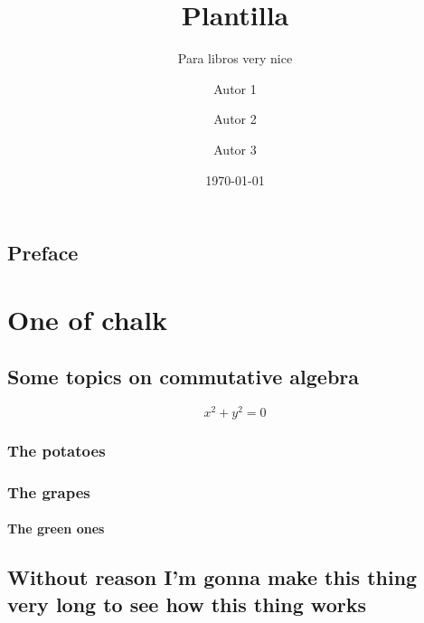 \documentclass[draft]{qx-files/qx-book}
\title{Plantilla}
\author{Autor 1 \and Autor 2 \and Autor 3}
\date{\today}
\subtitle{Para libros very nice}
\begin{document}
\MakeBookCover

\frontmatter


\maketitle





\chapter{Preface}

\lipsum[1]




\tableofcontents

\mainmatter

\part{One of chalk}


\chapter[Álgebra conmutativa]{Some topics on commutative algebra}
\lipsum[2]
\begin{equation}
  x^2 + y^2 = 0
\end{equation}

\lipsum[1]

\section{The potatoes}

\lipsum[1]



\lipsum[1]

\section{The grapes}

\lipsum[1]

\subsection{The green ones}

\lipsum[1]

\chapter*{Without reason I'm gonna make this thing very long to see how this thing works}
\end{document}

